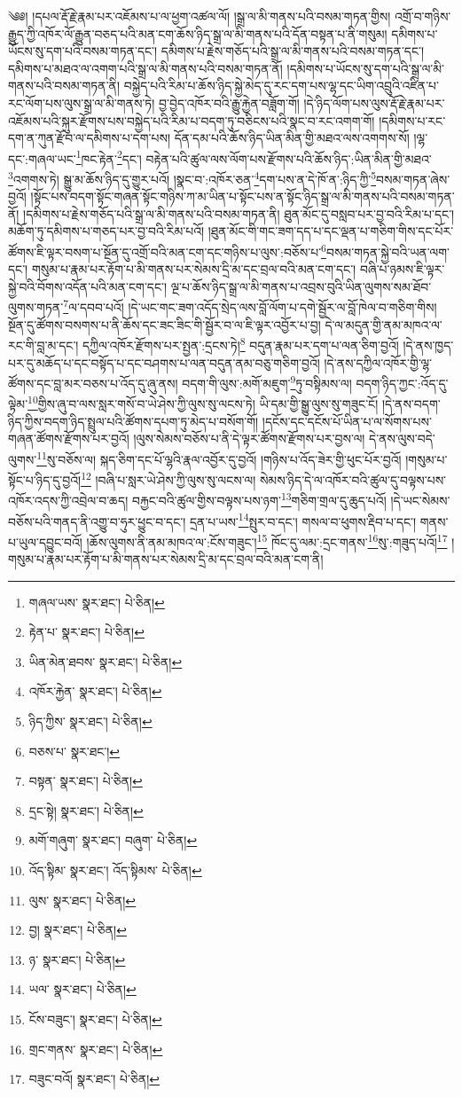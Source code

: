 \setcounter{footnote}{0} 
༄༅། །དཔལ་རྡོ་རྗེ་རྣམ་པར་འཇོམས་པ་ལ་ཕྱག་འཚལ་ལོ། །སྒྲ་ལ་མི་གནས་པའི་བསམ་གཏན་གྱིས། འགྲོ་བ་གཉིས་རྒྱུད་ཀྱི་འཁོར་ལོ་རྒྱུན་བཅད་པའི་མན་ངག་ཆོས་ཉིད་སྒྲ་ལ་མི་གནས་པའི་དོན་བསྟན་པ་ནི་གསུམ། དམིགས་པ་ཡོངས་སུ་དག་པའི་བསམ་གཏན་དང་། དམིགས་པ་རྗེས་གཅོད་པའི་སྒྲ་ལ་མི་གནས་པའི་བསམ་གཏན་དང་། དམིགས་པ་མཐའ་ལ་འགག་པའི་སྒྲ་ལ་མི་གནས་པའི་བསམ་གཏན་ནོ། །དམིགས་པ་ཡོངས་སུ་དག་པའི་སྒྲ་ལ་མི་གནས་པའི་བསམ་གཏན་ནི། བསྐྱེད་པའི་རིམ་པ་ཆོས་ཉིད་སྐྱེ་མེད་དུ་རང་དག་པས་ལྷ་དང་ཡིག་འབྲུའི་འཛིན་པ་རང་ལོག་པས་ལུས་སྒྲ་ལ་མི་གནས་ཏེ། བྱ་བྱེད་འཁོར་བའི་རྒྱུ་རྐྱེན་བཟློག་གོ། །དེ་ཉིད་ལོག་པས་ལུས་རྡོ་རྗེ་རྣམ་པར་འཇོམས་པའི་སྐུར་རྫོགས་པས་བསྐྱེད་པའི་རིམ་པ་བདག་ཏུ་བཅིངས་པའི་སྣང་བ་རང་འགག་གོ། །དམིགས་པ་རང་དག་ན་ཀུན་རྫོབ་ལ་དམིགས་པ་དག་པས། དོན་དམ་པའི་ཆོས་ཉིད་ཡིན་མིན་གྱི་མཐའ་ལས་འགགས་སོ། །ལྷ་དང་:གཞལ་ཡང་\footnote{གཞལ་ཡས་  སྣར་ཐང་།  པེ་ཅིན། }ཁང་རྟེན་\footnote{རྟེན་པ་  སྣར་ཐང་།  པེ་ཅིན། }དང་། བརྟེན་པའི་ཚུལ་ལས་ལོག་པས་རྫོགས་པའི་ཆོས་ཉིད་:ཡིན་མིན་གྱི་མཐའ་\footnote{ཡིན་མེན་ཐབས་  སྣར་ཐང་།  པེ་ཅིན། }འགགས་ཏེ། སྒྱུ་མ་ཆོས་ཉིད་དུ་གྱུར་པའོ། །སྣང་བ་:འཁོར་ཅན་\footnote{འཁོར་རྐྱེན་  སྣར་ཐང་།  པེ་ཅིན། }དག་པས་ན་དེ་ཁོ་ན་:ཉིད་ཀྱི་\footnote{ཉིད་ཀྱིས་  སྣར་ཐང་།  པེ་ཅིན། }བསམ་གཏན་ཞེས་བྱའོ། །སྟོང་པས་བདག་སྟོང་གཞན་སྟོང་གཉིས་ཀ་མ་ཡིན་པ་སྟོང་པས་ན་སྟོང་ཉིད་སྒྲ་ལ་མི་གནས་པའི་བསམ་གཏན་ནོ། །དམིགས་པ་རྗེས་གཅོད་པའི་སྒྲ་ལ་མི་གནས་པའི་བསམ་གཏན་ནི། ཐུན་མོང་དུ་བསླབ་པར་བྱ་བའི་རིམ་པ་དང་། མཆོག་ཏུ་དམིགས་པ་གཅད་པར་བྱ་བའི་རིམ་པའོ། །ཐུན་མོང་གི་གང་ཟག་དད་པ་དང་ལྡན་པ་གཅིག་གིས་དང་པོར་ཚོགས་ཇི་ལྟར་བསག་པ་སྔོན་དུ་འགྲོ་བའི་མན་ངག་དང་གཉིས་པ་ལུས་:བཅོས་པ་\footnote{བཅས་པ་  སྣར་ཐང་། }བསམ་གཏན་སྐྱེ་བའི་ཡན་ལག་དང་། གསུམ་པ་རྣམ་པར་རྟོག་པ་མི་གནས་པར་སེམས་དྲི་མ་དང་བྲལ་བའི་མན་ངག་དང་། བཞི་པ་ཉམས་ཇི་ལྟར་སྐྱེ་བའི་བོགས་འདོན་པའི་མན་ངག་དང་། ལྔ་པ་ཆོས་ཉིད་སྒྲ་ལ་མི་གནས་པ་འབྲས་བུའི་ཡིན་ལུགས་སམ་ཐོབ་ལུགས་གཏན་\footnote{བསྟན་  སྣར་ཐང་།  པེ་ཅིན། }ལ་དབབ་པའོ། །དེ་ཡང་གང་ཟག་འདོད་སྲེད་ལས་བློ་ལོག་པ་དགེ་སྦྱོར་ལ་བློ་ཁེལ་བ་གཅིག་གིས། སྔོན་དུ་ཚོགས་བསགས་པ་ནི་ཆོས་དང་ཟང་ཟིང་གི་སྦྱོར་བ་ལ་ཇི་ལྟར་འབྱོར་པ་བྱ། དེ་ལ་མདུན་གྱི་ནམ་མཁའ་ལ་རང་གི་བླ་མ་དང་། དཀྱིལ་འཁོར་རྫོགས་པར་སྤྱན་:དྲངས་ཏེ།\footnote{དྲང་སྟེ།  སྣར་ཐང་།  པེ་ཅིན། } བདུན་རྣམ་པར་དག་པ་ལན་ཅིག་བྱའོ། །དེ་ནས་ཁྱད་པར་དུ་མཆོད་པ་དང་བསྟོད་པ་དང་བཤགས་པ་ལན་བདུན་ནམ་བཅུ་གཅིག་བྱའོ། །དེ་ནས་དཀྱིལ་འཁོར་གྱི་ལྷ་ཚོགས་དང་བླ་མར་བཅས་པ་འོད་དུ་ཞུ་ནས། བདག་གི་ལུས་:མགོ་མཇུག་\footnote{མགོ་གཞུག་  སྣར་ཐང་། བཞུག་  པེ་ཅིན། }ཏུ་བསྟིམས་ལ། བདག་ཉིད་ཀྱང་:འོད་དུ་ལྟེམ་\footnote{འོད་སྟིམ་  སྣར་ཐང་། འོད་སྟིམས་  པེ་ཅིན། }གྱིས་ཞུ་བ་ལས་སླར་གསོ་བ་ཡེ་ཤེས་ཀྱི་ལུས་སུ་ལངས་ཏེ། ཡི་དམ་གྱི་སྒྱུ་ལུས་སུ་གཟུང་ངོ། །དེ་ནས་བདག་ཉིད་ཀྱིས་བདག་ཉིད་སྤྲུལ་པའི་ཚོགས་དཔག་ཏུ་མེད་པ་བསོག་གོ། །དངོས་དང་དངོས་པོ་ཡིན་པ་ལ་སོགས་པས་གཞན་ཚོགས་རྫོགས་པར་བྱའོ། །ལུས་སེམས་བཅོས་པ་ནི་དེ་ལྟར་ཚོགས་རྫོགས་པར་བྱས་ལ། དེ་ནས་ལུས་བདེ་ལུགས་\footnote{ལུས་  སྣར་ཐང་།  པེ་ཅིན། }སུ་བཅོས་ལ། སྐད་ཅིག་དང་པོ་ལྷའི་རྣལ་འབྱོར་དུ་བྱའོ། །གཉིས་པ་འོད་ཟེར་གྱི་ཕུང་པོར་བྱའོ། །གསུམ་པ་སྟོང་པ་ཉིད་དུ་བྱའོ།\footnote{བྱ།  སྣར་ཐང་།  པེ་ཅིན། } །བཞི་པ་སླར་ཡེ་ཤེས་ཀྱི་ལུས་སུ་ལངས་ལ། སེམས་ཉིད་དེ་ལ་འཁོར་བའི་ཚུལ་དུ་བལྟས་པས་འཁོར་འདས་ཀྱི་འབྲེལ་བ་ཆད། བརྐྱང་བའི་ཚུལ་གྱིས་བལྟས་པས་ཉག་\footnote{ཉ་  སྣར་ཐང་།  པེ་ཅིན། }གཅིག་གྲལ་དུ་ཆུད་པའོ། །དེ་ཡང་སེམས་བཅོས་པའི་གནད་ནི་འགྱུ་བ་ཧུར་ཕྱུང་བ་དང་། དྲན་པ་ཡས་\footnote{ཡལ་  སྣར་ཐང་།  པེ་ཅིན། }སྤུར་བ་དང་། གསལ་བ་ཕུགས་རྡིབ་པ་དང་། གནས་པ་ཡུལ་དབྱུང་བའོ། །ཆོས་ལུགས་ནི་ནམ་མཁའ་ལ་:ངོས་གཟུང་།\footnote{ངོས་བཟུང་།  སྣར་ཐང་།  པེ་ཅིན། } ཁོང་དུ་ལམ་:དྲང་གནས་\footnote{གྲང་གནས་  སྣར་ཐང་།  པེ་ཅིན། }སུ་:གཟུད་པའོ།\footnote{བཟུང་བའོ།  སྣར་ཐང་།  པེ་ཅིན། } །གསུམ་པ་རྣམ་པར་རྟོག་པ་མི་གནས་པར་སེམས་དྲི་མ་དང་བྲལ་བའི་མན་ངག་ནི། 